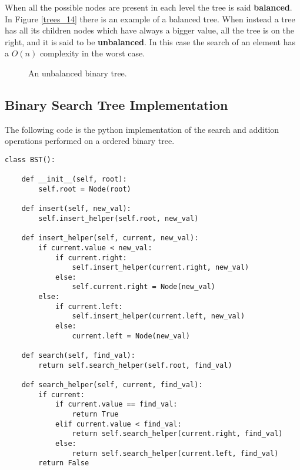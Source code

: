 When all the possible nodes are present in each level the tree is said \textbf{balanced}. In Figure \ref{trees_14} there is an example of a balanced tree.
When instead a tree has all its children nodes which have always a bigger value, all the tree is on the right, and it is said to be \textbf{unbalanced}. In this case the search of an element has a \(O(n)\) complexity in the worst case.

\begin{figure}[H]
\centering
{}
\caption[An unbalanced binary tree.]{An unbalanced binary tree.}
\label{trees_15}
\end{figure}

\subsection{Binary Search Tree Implementation}
The following code is the python implementation of the search and addition operations performed on a ordered binary tree.

\begin{lstlisting}[firstnumber=1, caption={implementation of insert and search operation for a binary search tree.}]
class BST():

	def __init__(self, root):
		self.root = Node(root)

	def insert(self, new_val):
		self.insert_helper(self.root, new_val)
	
	def insert_helper(self, current, new_val):
		if current.value < new_val:
			if current.right:
				self.insert_helper(current.right, new_val)
			else:
				self.current.right = Node(new_val)
		else:
			if current.left:
				self.insert_helper(current.left, new_val)
			else:
				current.left = Node(new_val)
	
	def search(self, find_val):
		return self.search_helper(self.root, find_val)
	
	def search_helper(self, current, find_val):
		if current:
			if current.value == find_val:
				return True
			elif current.value < find_val:
				return self.search_helper(current.right, find_val)
			else:
				return self.search_helper(current.left, find_val)
		return False
\end{lstlisting}

